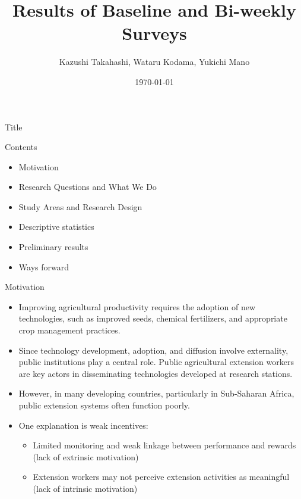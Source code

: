 \documentclass[aspectratio=169]{beamer}
\title[Short Title]{Results of Baseline and Bi-weekly Surveys}
\author[Takahashi et al.]{Kazushi Takahashi, Wataru Kodama, Yukichi Mano}
\date{\today}
\begin{document}
	
	\begin{frame}{Title}
		\titlepage
	\end{frame}
	
	\begin{frame}{Contents} %
		\begin{itemize}
			\item Motivation %
			\item Research Questions and What We Do
			\item Study Areas and Research Design
			\item Descriptive statistics
			\item Preliminary results 
			\item Ways forward  
		\end{itemize}
	\end{frame}
\begin{frame}{Motivation}
	
	\begin{itemize}
		\item Improving agricultural productivity requires the adoption of new technologies,
		such as improved seeds, chemical fertilizers, and appropriate crop management practices.
		
		\vspace{0.3cm}
		
		\item Since technology development, adoption, and diffusion involve externality,
		public institutions play a central role.
		Public agricultural extension workers are key actors in disseminating technologies
		developed at research stations.
		
		\vspace{0.3cm}
		
		\item However, in many developing countries, particularly in Sub-Saharan Africa,
		public extension systems often function poorly.
		
		\vspace{0.3cm}
		
		\item One explanation is weak incentives:
		\begin{itemize}
			\item Limited monitoring and weak linkage between performance and rewards
			(lack of extrinsic motivation)
			\item Extension workers may not perceive extension activities as meaningful
			(lack of intrinsic motivation)
		\end{itemize}
		
		\vspace{0.3cm}
		
		
	\end{itemize}
	
\end{frame}
\end{document}
